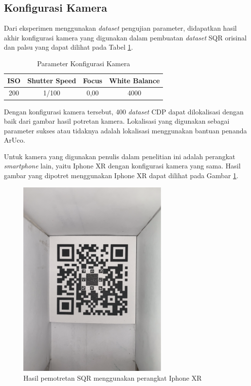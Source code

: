 \subsection{Konfigurasi Kamera}
Dari eksperimen menggunakan \emph{dataset} pengujian parameter, didapatkan hasil akhir konfigurasi kamera yang digunakan dalam pembuatan \emph{dataset} SQR
orisinal dan palsu yang dapat dilihat pada Tabel \ref{Tab: 4-Parameter Konfigurasi Kamera}.

\begin{table}[!ht]
	\centering
	\caption{Parameter Konfigurasi Kamera}
	\vspace{0.5em}
	\begin{tabular}{|c|c|c|c|}
		\hline
		\textbf{ISO} & \textbf{Shutter Speed} & \textbf{Focus} & \textbf{White Balance} \\ \hline
		200          & 1/100                  & 0,00           & 4000                   \\ \hline
	\end{tabular}
	\label{Tab: 4-Parameter Konfigurasi Kamera}
\end{table}

\noindent Dengan konfigurasi kamera tersebut, 400 \emph{dataset} CDP dapat dilokalisasi dengan baik dari gambar hasil potretan kamera. Lokalisasi yang digunakan sebagai
parameter sukses atau tidaknya adalah lokalisasi menggunakan bantuan penanda ArUco.

Untuk kamera yang digunakan penulis dalam penelitian ini adalah perangkat \emph{smartphone} lain, yaitu Iphone XR dengan konfigurasi kamera yang sama. Hasil
gambar yang dipotret menggunakan Iphone XR dapat dilihat pada Gambar \ref{Fig: 4-hasilfotoiphonexr}.

\begin{figure}[!h]
	\centering
	\includegraphics[width=7.5cm]{contents/chapter-4/4-hasilfotoiphonexr.png}
	\caption{Hasil pemotretan SQR menggunakan perangkat Iphone XR}
	\label{Fig: 4-hasilfotoiphonexr}
\end{figure}

